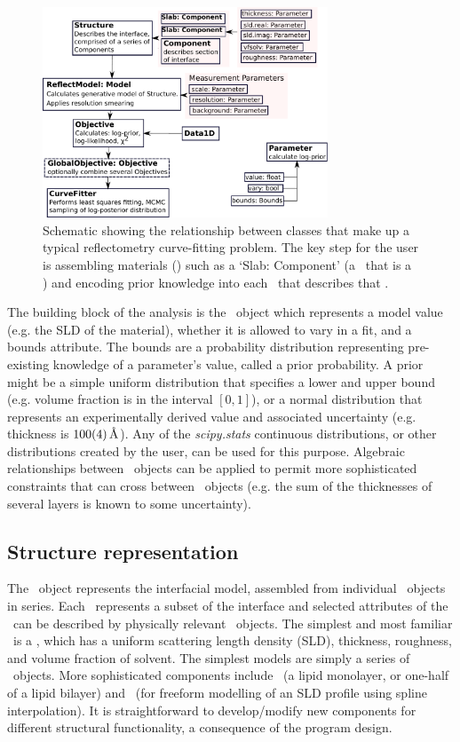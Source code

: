 \documentclass[pdf,preprint]{iucr}
\begin{document}
\begin{figure}
  \includegraphics[width=85mm]{components.pdf}
  \caption{Schematic showing the relationship between classes that make up a typical reflectometry curve-fitting problem. The key step for the user is assembling materials (\Component) such as a `Slab: Component' (a \Component\ that is a \Slab) and encoding prior knowledge into each \Parameter\ that describes that \Component.}
  \label{fig:components}
\end{figure}

The building block of the analysis is the \Parameter\ object which represents a model value (e.g. the SLD of the material), whether it is allowed to vary in a fit, and a bounds attribute. The bounds are a probability distribution representing pre-existing knowledge of a parameter's value, called a prior probability.
A prior might be a simple uniform distribution that specifies a lower and upper bound (e.g. volume fraction is in the interval $[0, 1]$), or a normal distribution that represents an experimentally derived value and associated uncertainty (e.g. thickness is $\SI{100+-4}{\angstrom}$).
Any of the \emph{scipy.stats} \cite{Jones2001-2017} continuous distributions, or other distributions created by the user, can be used for this purpose. Algebraic relationships between \Parameter\ objects can be applied to permit more sophisticated constraints that can cross between \Component\ objects (e.g. the sum of the thicknesses of several layers is known to some uncertainty).

\subsection{Structure representation}

The \Structure\ object represents the interfacial model, assembled from individual \Component\ objects in series. Each \Component\ represents a subset of the interface and selected attributes of the \Component\ can be described by physically relevant \Parameter\ objects. The simplest and most familiar \Component\ is a \Slab, which has a uniform scattering length density (SLD), thickness, roughness, and volume fraction of solvent. The simplest models are simply a series of \Slab\ objects.
More sophisticated components include \LipidLeaflet\ (a lipid monolayer, or one-half of a lipid bilayer) and \Spline\ (for freeform modelling of an SLD profile using spline interpolation).
It is straightforward to develop/modify new components for different structural functionality, a consequence of the program design.
\end{document}
